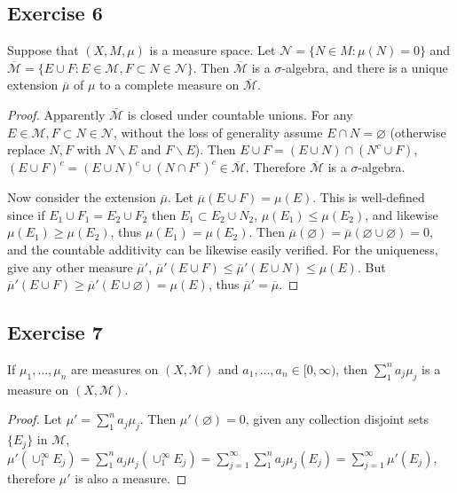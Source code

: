 \subsection*{Exercise 6}
Suppose that $(X,M,\mu)$ is a measure space. Let $\mathcal{N}=\{N\in M:\mu(N)=0\}$ and $\overline{\mathcal{M}}=\{E\cup F:E\in\mathcal{M}, F\subset N\in\mathcal{N}\}$. Then $\overline{\mathcal{M}}$ is a $\sigma$-algebra, and there is a unique extension $\overline{\mu}$ of $\mu$ to a complete measure on $\overline{\mathcal{M}}$.
\begin{proof}
    Apparently $\overline{\mathcal{M}}$ is closed under countable unions. For any $E\in\mathcal{M}, F\subset N\in\mathcal{N}$, without the loss of generality assume $E\cap N=\varnothing$ (otherwise replace $N,F$ with $N\backslash E$ and $F\backslash E$). Then $E\cup F=(E\cup N)\cap(N^c\cup F)$, $(E\cup F)^c=(E\cup N)^c\cup(N\cap F^c)^c\in\overline{\mathcal{M}}$. Therefore $\overline{\mathcal{M}}$ is a $\sigma$-algebra.
    \par Now consider the extension $\overline{\mu}$. Let $\overline{\mu}(E\cup F)=\mu(E)$. This is well-defined since if $E_1\cup F_1=E_2\cup F_2$ then $E_1\subset E_2\cup N_2$, $\mu(E_1)\le\mu(E_2)$, and likewise $\mu(E_1)\ge\mu(E_2)$, thus $\mu(E_1)=\mu(E_2)$. Then $\overline{\mu}(\varnothing)=\overline{\mu}(\varnothing\cup\varnothing)=0$, and the countable additivity can be likewise easily verified. For the uniqueness, give any other measure $\overline{\mu}'$, $\overline{\mu}'(E\cup F)\le\overline{\mu}'(E\cup N)\le\mu(E)$. But $\overline{\mu}'(E\cup F)\ge\overline{\mu}'(E\cup\varnothing)=\mu(E)$, thus $\overline{\mu}'=\overline{\mu}$.
\end{proof}
\subsection*{Exercise 7}
If $\mu_1,\dots,\mu_n$ are measures on $(X,\mathcal{M})$ and $a_1,\dots,a_n\in[0,\infty)$, then $\sum_1^n a_j\mu_j$ is a measure on $(X,\mathcal{M})$.
\begin{proof}
    Let $\mu'=\sum^n_1 a_j\mu_j$. Then $\mu'(\varnothing)=0$, given any collection disjoint sets $\{E_j\}$ in $\mathcal{M}$, $\mu'(\cup_1^\infty E_j)=\sum^n_1a_j\mu_j(\cup_1^\infty E_j)=\sum^{\infty}_{j=1}\sum^n_1a_j\mu_j(E_j)=\sum^\infty_{j=1}\mu'(E_j)$, therefore $\mu'$ is also a measure.
\end{proof}

